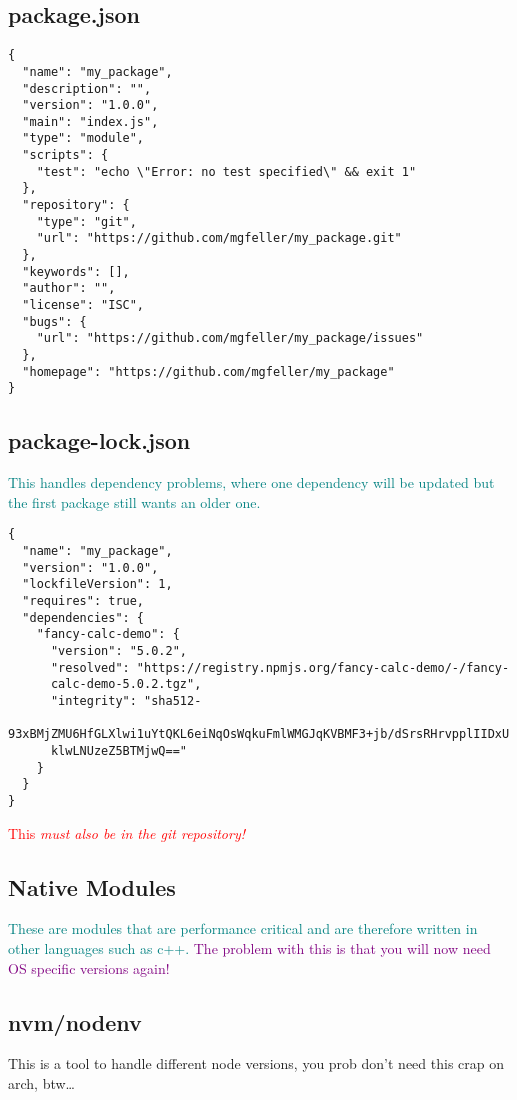 \documentclass[main.tex,fontsize=8pt,paper=a4,paper=portrait,DIV=calc,]{scrartcl}
\begin{document}
\subsection{package.json}
\begin{lstlisting}
{
  "name": "my_package",
  "description": "",
  "version": "1.0.0",
  "main": "index.js",
  "type": "module",
  "scripts": {
    "test": "echo \"Error: no test specified\" && exit 1"
  },
  "repository": {
    "type": "git",
    "url": "https://github.com/mgfeller/my_package.git"
  },
  "keywords": [],
  "author": "",
  "license": "ISC",
  "bugs": {
    "url": "https://github.com/mgfeller/my_package/issues"
  },
  "homepage": "https://github.com/mgfeller/my_package"
}
\end{lstlisting}

\subsection{package-lock.json}
\textcolor{teal}{This handles dependency problems, where one dependency will be updated but the first package still wants an older one.}\newline
\begin{lstlisting}
{
  "name": "my_package",
  "version": "1.0.0",
  "lockfileVersion": 1,
  "requires": true,
  "dependencies": {
    "fancy-calc-demo": {
      "version": "5.0.2",
      "resolved": "https://registry.npmjs.org/fancy-calc-demo/-/fancy-
      calc-demo-5.0.2.tgz",
      "integrity": "sha512-
      93xBMjZMU6HfGLXlwi1uYtQKL6eiNqOsWqkuFmlWMGJqKVBMF3+jb/dSrsRHrvpplIIDxU
      klwLNUzeZ5BTMjwQ=="
    }
  }
}
\end{lstlisting}
\textcolor{red}{This \emph{must also be in the git repository!}}

\subsection{Native Modules}
\textcolor{teal}{These are modules that are performance critical and are therefore written in other languages such as c++.}\newline
\textcolor{purple}{The problem with this is that you will now need OS specific versions again!}

\subsection{nvm/nodenv}
This is a tool to handle different node versions, you prob don't need this crap on arch, btw\dots
\end{document}
